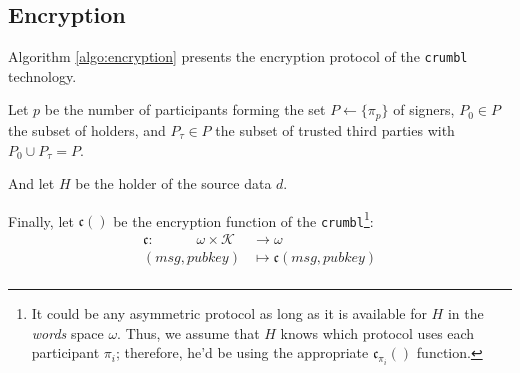 \documentclass[twoside,twocolumn]{article}
\theoremstyle{definition}
\theoremstyle{remark}
\begin{document}
\subsection{Encryption}

Algorithm \ref{algo:encryption} presents the encryption protocol of the \texttt{crumbl}\texttrademark~ technology.

\vspace{1em} %

Let $p$ be the number of participants forming the set $P \gets \{ \pi_p\}$ of signers, $P_0 \in P$ the subset of holders, and $P_\tau \in P$ the subset 
of trusted third parties with $P_0 \cup P_\tau = P$.

And let $H$ be the holder of the source data $d$.

Finally, let $\mathfrak{c}()$ be the encryption function of the \texttt{crumbl}\footnote{It could be any asymmetric protocol as long as it is available 
for $H$ in the \emph{words} space $\omega$. Thus, we assume that $H$ knows which protocol uses each participant $\pi_i$; therefore, he'd be using the 
appropriate $\mathfrak{c}_{\pi_i}()$ function.}:
\begin{equation}
    \label{eq:encrypt}
    \begin{array}{rl}
        \mathfrak{c}: \qquad \quad \omega \times \mathcal{K} &\to \omega \\
                (msg, pubkey) &\mapsto \mathfrak{c}(msg, pubkey) \\
    \end{array}
\end{equation}
\end{document}
